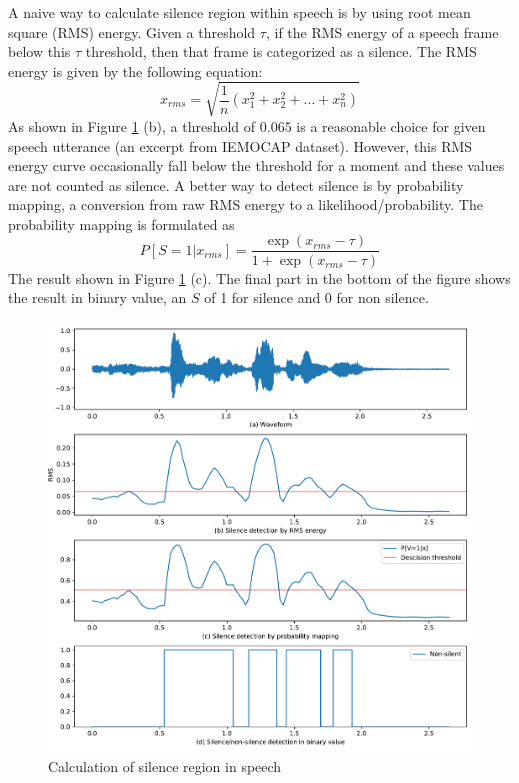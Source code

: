 A naive way to calculate silence region within speech is by using root mean
square (RMS) energy. Given a threshold $\tau$, if the RMS energy of a speech
frame below this $\tau$ threshold, then that frame is categorized as a silence. 
The RMS energy is given by the following equation:
\begin{equation}
  x_{rms} = \sqrt{\dfrac{1}{n} (x_1^2 + x_2^2 + \ldots + x_n^2)}
\end{equation}
As shown in Figure \ref{fig:silence} (b), a threshold of $0.065$ is a reasonable
choice for given speech utterance (an excerpt from IEMOCAP dataset). However,
this RMS energy curve occasionally fall below the threshold for a moment and
these values are not counted as silence. A better way to detect silence is by
probability mapping, a conversion from raw RMS energy to a
likelihood/probability. The probability mapping is formulated as 
\begin{equation}
  P[S=1 | x_{rms}] = \frac{\exp(x_{rms} - \tau)}{1 + \exp(x_{rms} - \tau)}
\end{equation}
The result shown in Figure \ref{fig:silence} (c). The final part in the bottom
of the figure shows the result in binary value, an $S$ of 1 for silence and 0
for non silence.

\begin{figure}
  \centering
  \includegraphics[width=\textwidth]{../fig/silence.pdf}
  \caption{Calculation of silence region in speech}
  \label{fig:silence}
\end{figure}

